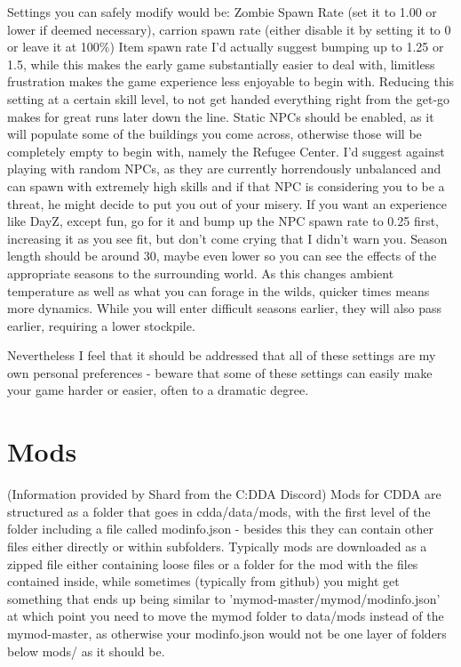 \documentclass[11pt]{report}
\begin{document}
Settings you can safely modify would be: Zombie Spawn Rate (set it to 1.00 or lower if deemed necessary), carrion spawn rate (either disable it by setting it to 0 or leave it at 100\%) Item spawn rate I'd actually suggest bumping up to 1.25 or 1.5, while this makes the early game substantially easier to deal with, limitless frustration makes the game experience less enjoyable to begin with. Reducing this setting at a certain skill level, to not get handed everything right from the get-go makes for great runs later down the line. Static NPCs should be enabled, as it will populate some of the buildings you come across, otherwise those will be completely empty to begin with, namely the Refugee Center.
I'd suggest against playing with random NPCs, as they are currently horrendously unbalanced and can spawn with extremely high skills and if that NPC is considering you to be a threat, he might decide to put you out of your misery. If you want an experience like DayZ, except fun, go for it and bump up the NPC spawn rate to 0.25 first, increasing it as you see fit, but don't come crying that I didn't warn you.
Season length should be around 30, maybe even lower so you can see the effects of the appropriate seasons to the surrounding world. As this changes ambient temperature as well as what you can forage in the wilds, quicker times means more dynamics. While you will enter difficult seasons earlier, they will also pass earlier, requiring a lower stockpile.

Nevertheless I feel that it should be addressed that all of these settings are my own personal preferences - beware that some of these settings can easily make your game harder or easier, often to a dramatic degree.

\section{Mods}

(Information provided by Shard from the C:DDA Discord)
Mods for CDDA are structured as a folder that goes in cdda/data/mods, with the first level of the folder including a file called modinfo.json - besides this they can contain other files either directly or within subfolders.  Typically mods are downloaded as a zipped file either containing loose files or a folder for the mod with the files contained inside, while sometimes (typically from github) you might get something that ends up being similar to 'mymod-master/mymod/modinfo.json' at which point you need to move the mymod folder to data/mods instead of the mymod-master, as otherwise your modinfo.json would not be one layer of folders below mods/ as it should be.
\end{document}
